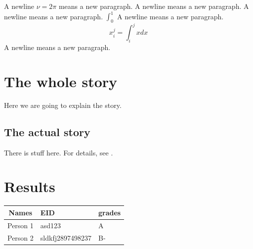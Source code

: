 \documentclass{article}
\begin{document}
A newline $\nu=2\pi$ means a new paragraph. A newline means a new paragraph. A
newline means a new paragraph. $\int_0^1$ A newline means a new paragraph.
\[ x_i^j = \int_i^j xdx \] 
A
newline means a new paragraph.

\section{The whole story}
Here we are going to explain the story.

\subsection{The actual story}
\label{sec:story}

There is stuff here.
For details, see \cite{Eijkhout:hpc}.

\section{Results}

\begin{tabular}{c|l|l}
  \hline
  Names& EID & grades \\
  \hline
  Person 1& asd123 & A \\
  Person 2& sldkfj2897498237 & B- \\
  \hline
\end{tabular}



\end{document}
